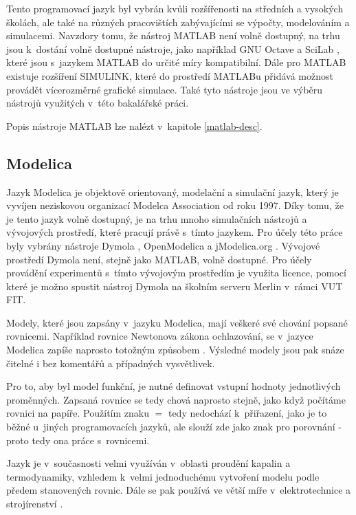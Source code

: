 Tento programovací jazyk byl vybrán kvůli rozšířenosti na středních a vysokých školách, ale také na různých pracovištích zabývajícími se výpočty, modelováním a simulacemi. Navzdory tomu, že nástroj MATLAB není volně dostupný, na trhu jsou k~dostání volně dostupné nástroje, jako například GNU Octave \cite{OctaveManual} a SciLab \cite{scilab}, které jsou s~jazykem MATLAB do určité míry kompatibilní. Dále pro MATLAB existuje rozšíření SIMULINK, které do prostředí MATLABu přidává možnost provádět vícerozměrné grafické simulace. Také tyto nástroje jsou ve výběru nástrojů využitých v~této bakalářské práci.

Popis nástroje MATLAB lze nalézt v~kapitole \ref{matlab-desc}.
\subsection*{Modelica}
\label{modelica-lang}
Jazyk Modelica je objektově orientovaný, modelační a simulační jazyk, který je vyvíjen neziskovou organizací Modelca Association od roku 1997. Díky tomu, že je tento jazyk volně dostupný, je na trhu mnoho simulačních nástrojů a vývojových prostředí, které pracují právě s~tímto jazykem. Pro účely této práce byly vybrány nástroje Dymola \cite{Fritzson02modelica--}, OpenModelica \cite{Fritzson02modelica--} a jModelica.org \cite{jmodelica}. Vývojové prostředí Dymola není, stejně jako MATLAB, volně dostupné. Pro účely provádění experimentů s~tímto vývojovým prostředím je využita licence, pomocí které je možno spustit nástroj Dymola na školním serveru Merlin v~rámci VUT FIT.

Modely, které jsou zapsány v~jazyku Modelica, mají veškeré své chování popsané rovnicemi. Například rovnice Newtonova zákona ochlazování, se v~jazyce Modelica zapíše naprosto totožným způsobem \cite{modelica-example}. Výsledné modely jsou pak snáze čitelné i bez komentářů a případných vysvětlivek.

Pro to, aby byl model funkční, je nutné definovat vstupní hodnoty jednotlivých proměnných. Zapsaná rovnice se tedy chová naprosto stejně, jako když počítáme rovnici na papíře. Použítím znaku $ = $ tedy nedochází k~přiřazení, jako je to běžné u~jiných programovacích jazyků, ale slouží zde jako znak pro porovnání - proto tedy ona práce s~rovnicemi.

Jazyk je v~současnosti velmi využíván v~oblasti proudění kapalin a termodynamiky, vzhledem k~velmi jednoduchému vytvoření modelu podle předem stanovených rovnic. Dále se pak používá ve větší míře v~elektrotechnice a strojírenství \cite{modelica-example}.

